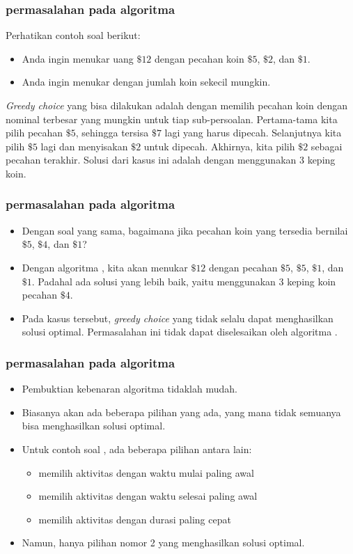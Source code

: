\begin{frame}
	\frametitle{permasalahan pada algoritma }
	Perhatikan contoh soal berikut:
	\begin{itemize}
		\item Anda ingin menukar uang $\$12$ dengan pecahan koin $\$5$, $\$2$, dan $\$1$.
		\item Anda ingin menukar dengan jumlah koin sekecil mungkin.
	\end{itemize}
	\textit{Greedy choice} yang bisa dilakukan adalah dengan memilih pecahan koin dengan nominal terbesar yang mungkin untuk tiap sub-persoalan. Pertama-tama kita pilih pecahan $\$5$, sehingga tersisa $\$7$ lagi yang harus dipecah. Selanjutnya kita pilih $\$5$ lagi dan menyisakan $\$2$ untuk dipecah. Akhirnya, kita pilih $\$2$ sebagai pecahan terakhir. Solusi dari kasus ini adalah dengan menggunakan 3 keping koin.
\end{frame}

\begin{frame}
	\frametitle{permasalahan pada algoritma }
	\begin{itemize}
		\item Dengan soal yang sama, bagaimana jika pecahan koin yang tersedia bernilai $\$5$, $\$4$, dan $\$1$?
		\item Dengan algoritma , kita akan menukar  $\$12$ dengan pecahan $\$5$, $\$5$, $\$1$, dan $\$1$. Padahal ada solusi yang lebih baik, yaitu menggunakan 3 keping koin pecahan $\$4$.
		\item Pada kasus tersebut, \textit{greedy choice} yang tidak selalu dapat menghasilkan solusi optimal. Permasalahan ini tidak dapat diselesaikan oleh algoritma .
	\end{itemize}
\end{frame}

\begin{frame}
	\frametitle{permasalahan pada algoritma }
	\begin{itemize}
		\item Pembuktian kebenaran algoritma  tidaklah mudah.
		\item Biasanya akan ada beberapa pilihan   yang ada, yang mana tidak semuanya bisa menghasilkan solusi optimal.
		\item Untuk contoh soal  , ada beberapa pilihan   antara lain:
		\begin{itemize}
			\item memilih aktivitas dengan waktu mulai paling awal
			\item memilih aktivitas dengan waktu selesai paling awal
			\item memilih aktivitas dengan durasi paling cepat
		\end{itemize}
		\item Namun, hanya pilihan nomor 2 yang menghasilkan solusi optimal.
	\end{itemize}
\end{frame}

